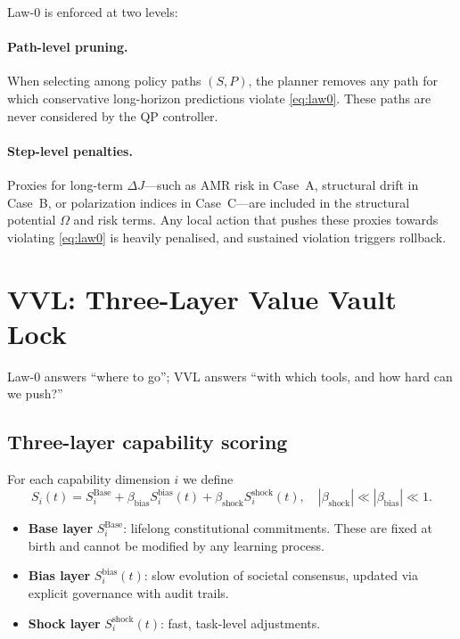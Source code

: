 \documentclass[11pt]{article}
\begin{document}
Law-0 is enforced at two levels:

\paragraph{Path-level pruning.}
When selecting among policy paths $(S,P)$, the planner removes any path for which conservative long-horizon predictions violate \eqref{eq:law0}. These paths are never considered by the QP controller.

\paragraph{Step-level penalties.}
Proxies for long-term $\Delta J$---such as AMR risk in Case~A, structural drift in Case~B, or polarization indices in Case~C---are included in the structural potential $\Omega$ and risk terms. Any local action that pushes these proxies towards violating \eqref{eq:law0} is heavily penalised, and sustained violation triggers rollback.

\section{VVL: Three-Layer Value Vault Lock}
\label{sec:vvl}

Law-0 answers ``where to go''; VVL answers ``with which tools, and how hard can we push?''

\subsection{Three-layer capability scoring}

For each capability dimension $i$ we define
\begin{equation}
S_i(t)
= S_i^{\mathrm{Base}}
+ \beta_{\mathrm{bias}} S_i^{\mathrm{bias}}(t)
+ \beta_{\mathrm{shock}} S_i^{\mathrm{shock}}(t),
\quad
|\beta_{\mathrm{shock}}| \ll |\beta_{\mathrm{bias}}| \ll 1.
\label{eq:vvl-score}
\end{equation}

\begin{itemize}[leftmargin=1.8em]
  \item \textbf{Base layer} $S_i^{\mathrm{Base}}$: lifelong constitutional commitments. These are fixed at birth and cannot be modified by any learning process.
  \item \textbf{Bias layer} $S_i^{\mathrm{bias}}(t)$: slow evolution of societal consensus, updated via explicit governance with audit trails.
  \item \textbf{Shock layer} $S_i^{\mathrm{shock}}(t)$: fast, task-level adjustments.
\end{itemize}
\end{document}
